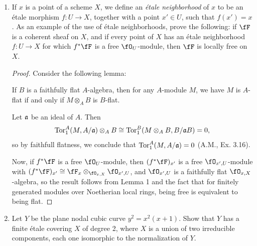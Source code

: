 \documentclass[a4paper]{article}
\begin{document}
\begin{enumerate} [label=\textbf{\arabic*.}, leftmargin=0em]
  \item[\textbf{5.}] If $x$ is a point of a scheme $X$, we define an \textit{étale neighborhood} of $x$ to be an étale morphism $f : U \to X$, together with a point $x' \in U$, such that $f(x') = x$. As an example of the use of étale neighborhoods, prove the following: if $\fF$ is a coherent sheaf on $X$, and if every point of $X$ has an étale neighborhood $f : U \to X$ for which $f^*\fF$ is a free $\fO_U$-module, then $\fF$ is locally free on $X$.

        \begin{proof}
          Consider the following lemma:
          \begin{lemma}
            If $B$ is a faithfully flat $A$-algebra, then for any $A$-module $M$, we have $M$ is $A$-flat if and only if $M \otimes_A B$ is $B$-flat.
          \end{lemma}
          Let $\mathfrak{a}$ be an ideal of $A$.
          Then
          \begin{equation*}
            \operatorname{Tor}_1^A(M, A / \mathfrak{a}) \otimes_A B \cong \operatorname{Tor}_1^B(M \otimes_A B, B / \mathfrak{a}B) = 0,
          \end{equation*}
          so by faithfull flatness, we conclude that $\operatorname{Tor}_1^A(M, A / \mathfrak{a}) = 0$ (A.M., Ex. 3.16).

          Now, if $f^*\fF$ is a free $\fO_U$-module, then $(f^*\fF)_{x'}$ is a free $\fO_{x', U}$-module with $(f^*\fF)_{x'} \cong \fF_x \otimes_{\fO_{x, X}} \fO_{x', U}$, and $\fO_{x', U}$ is a faithfully flat $\fO_{x, X}$-algebra, so the result follows from Lemma 1 and the fact that for finitely generated modules over Noetherian local rings, being free is equivalent to being flat.
        \end{proof}

  \item[\textbf{6.}] Let $Y$ be the plane nodal cubic curve $y^2 = x^2(x + 1)$. Show that $Y$ has a finite étale covering $X$ of degree 2, where $X$ is a union of two irreducible components, each one isomorphic to the normalization of $Y$.


\end{enumerate}
\end{document}
